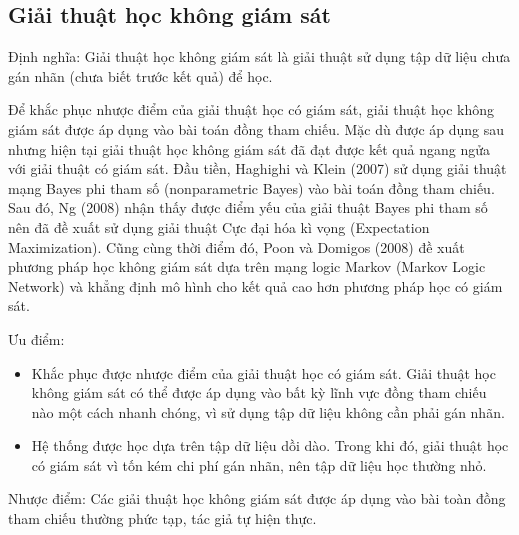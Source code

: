 \documentclass[12pt]{report}
\begin{document}
				\subsection*{Giải thuật học không giám sát}
					\par Định nghĩa: Giải thuật học không giám sát là giải thuật sử dụng tập dữ liệu chưa gán nhãn (chưa biết trước kết quả) để học.
					\par Để khắc phục nhược điểm của giải thuật học có giám sát, giải thuật học không giám sát được áp dụng vào bài toán đồng tham chiếu. Mặc dù được áp dụng sau nhưng hiện tại giải thuật học không giám sát đã đạt được kết quả ngang ngửa với giải thuật có giám sát. Đầu tiền, Haghighi và Klein (2007)\cite{haghighi09} sử dụng giải thuật mạng Bayes phi tham số (nonparametric Bayes) vào bài toán đồng tham chiếu. Sau đó, Ng (2008)\cite{ng08} nhận thấy được điểm yếu của giải thuật Bayes phi tham số nên đã đề xuất sử dụng giải thuật Cực đại hóa kì vọng (Expectation Maximization). Cũng cùng thời điểm đó, Poon và Domigos (2008)\cite{poon08} đề xuất phương pháp học không giám sát dựa trên mạng logic Markov (Markov Logic Network) và khẳng định mô hình cho kết quả cao hơn phương pháp học có giám sát.
					\par Ưu điểm:
					\begin{itemize}
						\item{Khắc phục được nhược điểm của giải thuật học có giám sát. Giải thuật học không giám sát có thể được áp dụng vào bất kỳ lĩnh vực đồng tham chiếu nào một cách nhanh chóng, vì sử dụng tập dữ liệu  không cần phải gán nhãn.}
						\item{Hệ thống được học dựa trên tập dữ liệu dồi dào. Trong khi đó, giải thuật học có giám sát vì tốn kém chi phí gán nhãn, nên tập dữ liệu học thường nhỏ.}
					\end{itemize}
					\par Nhược điểm: Các giải thuật học không giám sát được áp dụng vào bài toàn đồng tham chiếu thường phức tạp, tác giả tự hiện thực.
\end{document}
